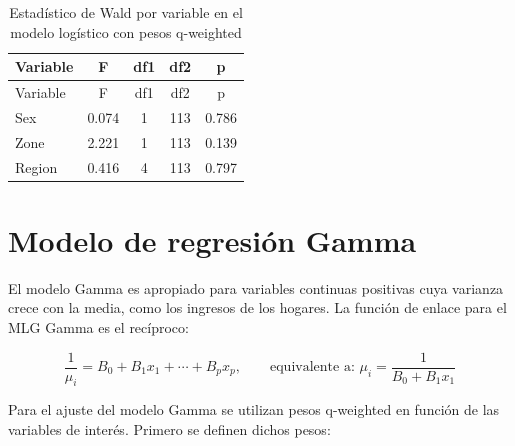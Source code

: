 \documentclass[
  spanish,
  12pt,
]{book}
\newenvironment{Shaded}{\begin{snugshade}}{\end{snugshade}}
\newcommand{\AttributeTok}[1]{\textcolor[rgb]{0.13,0.29,0.53}{#1}}
\newcommand{\ConstantTok}[1]{\textcolor[rgb]{0.56,0.35,0.01}{#1}}
\newcommand{\FunctionTok}[1]{\textcolor[rgb]{0.13,0.29,0.53}{\textbf{#1}}}
\newcommand{\NormalTok}[1]{#1}
\newcommand{\OtherTok}[1]{\textcolor[rgb]{0.56,0.35,0.01}{#1}}
\newcommand{\SpecialCharTok}[1]{\textcolor[rgb]{0.81,0.36,0.00}{\textbf{#1}}}
\begin{document}
\begin{longtable}[]{@{}lcccc@{}}
\caption{\label{tab:tab-wald-logistica-qwgt}Estadístico de Wald por variable en el modelo logístico con pesos q-weighted}\tabularnewline
\toprule\noalign{}
Variable & F & df1 & df2 & p \\
\midrule\noalign{}
\endfirsthead
\toprule\noalign{}
Variable & F & df1 & df2 & p \\
\midrule\noalign{}
\endhead
\bottomrule\noalign{}
\endlastfoot
Sex & 0.074 & 1 & 113 & 0.786 \\
Zone & 2.221 & 1 & 113 & 0.139 \\
Region & 0.416 & 4 & 113 & 0.797 \\
\end{longtable}

\section{Modelo de regresión Gamma}\label{sec-gamma}

El modelo Gamma es apropiado para variables continuas positivas cuya varianza crece con la media, como los ingresos de los hogares. La función de enlace para el MLG Gamma es el recíproco:

\[
\frac{1}{\mu_i} = B_0 + B_1 x_1 + \cdots + B_p x_p, \qquad \text{equivalente a: } \mu_i = \frac{1}{B_0 + B_1 x_1}
\]

Para el ajuste del modelo Gamma se utilizan pesos q-weighted en función de las variables de interés. Primero se definen dichos pesos:

\begin{Shaded}
\end{Shaded}
\end{document}
